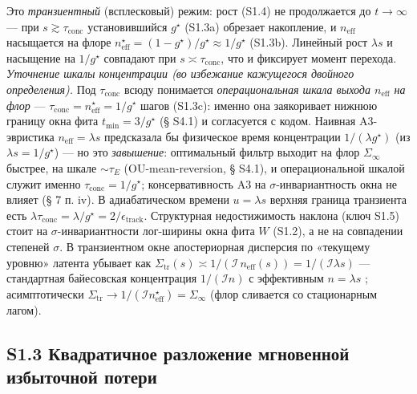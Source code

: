 \documentclass[12pt]{iopart}
\begin{document}
Это \emph{транзиентный} (всплесковый) режим: рост (S1.4) не продолжается до \(t\to\infty\) --- при \(s \gtrsim \tau_{\text{conc}}\) установившийся \(g^\star\) (S1.3a) обрезает накопление, и \(n_{\text{eff}}\) насыщается на флоре \(n_{\text{eff}}^\star = (1-g^\star)/g^\star \approx 1/g^\star\) (S1.3b). Линейный рост \(\lambda s\) и насыщение на \(1/g^\star\) совпадают при \(s \asymp \tau_{\text{conc}}\), что и фиксирует момент перехода. \emph{Уточнение шкалы концентрации (во избежание кажущегося двойного определения).} Под \(\tau_{\text{conc}}\) всюду понимается \emph{операциональная шкала выхода \(n_{\text{eff}}\) на флор} --- \(\tau_{\text{conc}} = n_{\text{eff}}^\star = 1/g^\star\) шагов (S1.3c): именно она заякоривает нижнюю границу окна фита \(t_{\min} = 3/g^\star\) (§ S4.1) и согласуется с кодом. Наивная A3-эвристика \(n_{\text{eff}} = \lambda s\) предсказала бы физическое время концентрации \(1/(\lambda g^\star)\) (из \(\lambda s = 1/g^\star\)) --- но это \emph{завышение}: оптимальный фильтр выходит на флор \(\Sigma_\infty\) быстрее, на шкале \(\sim\tau_E\) (OU-mean-reversion, § S4.1), и операциональной шкалой служит именно \(\tau_{\text{conc}} = 1/g^\star\); консервативность A3 на \(\sigma\)-инвариантность окна не влияет (§ 7 п. iv). В адиабатическом времени \(u = \lambda s\) верхняя граница транзиента есть \(\lambda\tau_{\text{conc}} = \lambda/g^\star = 2/\epsilon_{\text{track}}\). Структурная недостижимость наклона (ключ S1.5) стоит на \(\sigma\)-инвариантности лог-ширины окна фита \(W\) (S1.2), а не на совпадении степеней \(\sigma\). В транзиентном окне апостериорная дисперсия по «текущему уровню» латента убывает как \(\Sigma_{\text{tr}}(s) \asymp 1/(\mathcal I\,n_{\text{eff}}(s)) = 1/(\mathcal I\lambda s)\) --- стандартная байесовская концентрация \(1/(\mathcal I n)\) с эффективным \(n = \lambda s\) \cite{ClarkeBarron1990}; асимптотически \(\Sigma_{\text{tr}} \to 1/(\mathcal I n_{\text{eff}}^\star) = \Sigma_\infty\) (флор сливается со стационарным лагом).



\subsection{S1.3 Квадратичное разложение мгновенной избыточной потери}\label{s1.3-ux43aux432ux430ux434ux440ux430ux442ux438ux447ux43dux43eux435-ux440ux430ux437ux43bux43eux436ux435ux43dux438ux435-ux43cux433ux43dux43eux432ux435ux43dux43dux43eux439-ux438ux437ux431ux44bux442ux43eux447ux43dux43eux439-ux43fux43eux442ux435ux440ux438}
\end{document}
